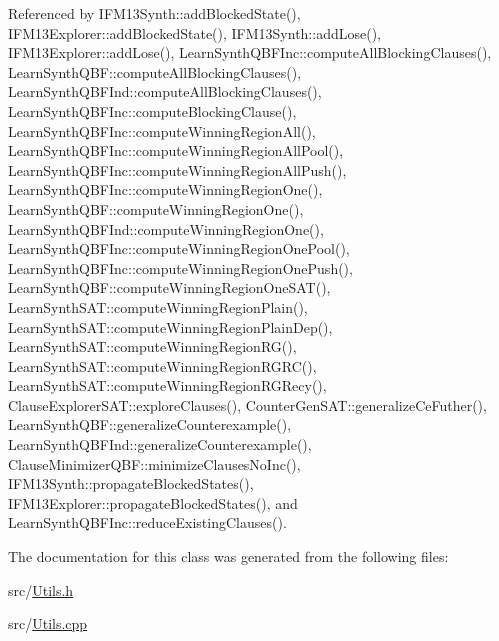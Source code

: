 Referenced by I\-F\-M13\-Synth\-::add\-Blocked\-State(), I\-F\-M13\-Explorer\-::add\-Blocked\-State(), I\-F\-M13\-Synth\-::add\-Lose(), I\-F\-M13\-Explorer\-::add\-Lose(), Learn\-Synth\-Q\-B\-F\-Inc\-::compute\-All\-Blocking\-Clauses(), Learn\-Synth\-Q\-B\-F\-::compute\-All\-Blocking\-Clauses(), Learn\-Synth\-Q\-B\-F\-Ind\-::compute\-All\-Blocking\-Clauses(), Learn\-Synth\-Q\-B\-F\-Inc\-::compute\-Blocking\-Clause(), Learn\-Synth\-Q\-B\-F\-Inc\-::compute\-Winning\-Region\-All(), Learn\-Synth\-Q\-B\-F\-Inc\-::compute\-Winning\-Region\-All\-Pool(), Learn\-Synth\-Q\-B\-F\-Inc\-::compute\-Winning\-Region\-All\-Push(), Learn\-Synth\-Q\-B\-F\-Inc\-::compute\-Winning\-Region\-One(), Learn\-Synth\-Q\-B\-F\-::compute\-Winning\-Region\-One(), Learn\-Synth\-Q\-B\-F\-Ind\-::compute\-Winning\-Region\-One(), Learn\-Synth\-Q\-B\-F\-Inc\-::compute\-Winning\-Region\-One\-Pool(), Learn\-Synth\-Q\-B\-F\-Inc\-::compute\-Winning\-Region\-One\-Push(), Learn\-Synth\-Q\-B\-F\-::compute\-Winning\-Region\-One\-S\-A\-T(), Learn\-Synth\-S\-A\-T\-::compute\-Winning\-Region\-Plain(), Learn\-Synth\-S\-A\-T\-::compute\-Winning\-Region\-Plain\-Dep(), Learn\-Synth\-S\-A\-T\-::compute\-Winning\-Region\-R\-G(), Learn\-Synth\-S\-A\-T\-::compute\-Winning\-Region\-R\-G\-R\-C(), Learn\-Synth\-S\-A\-T\-::compute\-Winning\-Region\-R\-G\-Recy(), Clause\-Explorer\-S\-A\-T\-::explore\-Clauses(), Counter\-Gen\-S\-A\-T\-::generalize\-Ce\-Futher(), Learn\-Synth\-Q\-B\-F\-::generalize\-Counterexample(), Learn\-Synth\-Q\-B\-F\-Ind\-::generalize\-Counterexample(), Clause\-Minimizer\-Q\-B\-F\-::minimize\-Clauses\-No\-Inc(), I\-F\-M13\-Synth\-::propagate\-Blocked\-States(), I\-F\-M13\-Explorer\-::propagate\-Blocked\-States(), and Learn\-Synth\-Q\-B\-F\-Inc\-::reduce\-Existing\-Clauses().



The documentation for this class was generated from the following files\-:\begin{DoxyCompactItemize}
\item 
src/\hyperlink{Utils_8h}{Utils.\-h}\item 
src/\hyperlink{Utils_8cpp}{Utils.\-cpp}\end{DoxyCompactItemize}
